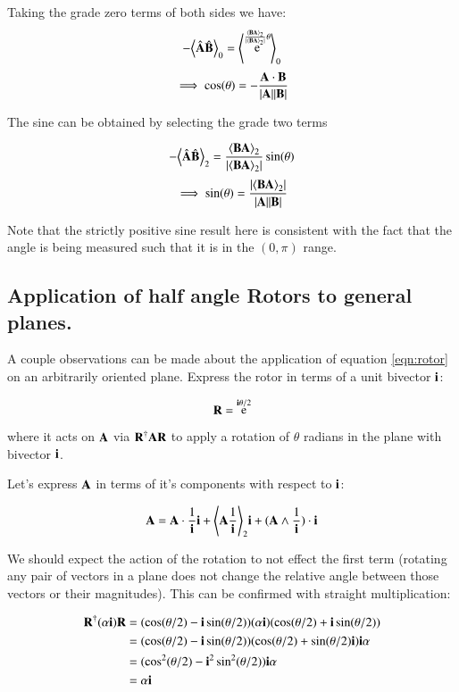\documentclass{article}      %
\DeclareMathOperator{\Exp}{e}
\newcommand{\gpgrade}[2] {{\left\langle{{#1}}\right\rangle}_{#2}}
\newcommand{\gpgradezero}[1] {\gpgrade{#1}{0}}
\newcommand{\gpgradetwo}[1] {\gpgrade{#1}{2}}
\begin{document}
Taking the grade zero terms of both sides we have:
\[
-\gpgradezero{\hat{\BA} \hat{\BB}} = \gpgradezero{ \Exp^{ \frac{\gpgradetwo{\BB \BA}}{\abs{\gpgradetwo{\BB \BA}}} \theta} }
\]
\[
\implies
\cos(\theta) = - \frac{\mathbf{A} \cdot \mathbf{B}}{\lvert{\mathbf{A}}\rvert\lvert{\mathbf{B}}\rvert}
\]


The sine can be obtained by selecting the grade two terms

\[
-\gpgradetwo{\hat{\BA} \hat{\BB}} = \frac{\gpgradetwo{\BB \BA}}{\abs{\gpgradetwo{\BB \BA}}} \sin(\theta)
\]
\[
\implies
\sin(\theta) = \frac{\abs{\gpgradetwo{\BB \BA}}}{ \abs{\BA}\abs{\BB} }
\]

Note that the strictly positive sine result here is consistent with the fact that the angle is being measured such that it is in the
$(0,\pi)$ range.

\subsection{ Application of half angle Rotors to general planes. }

A couple observations can be made about the application of equation \ref{eqn:rotor} on an arbitrarily oriented plane.  Express the rotor
in terms of a unit bivector $\mathbf{i}$:

\[
\BR = \Exp^{\Bi\theta/2}
\]

where it acts on $\mathbf{A}$ via $\mathbf{R}^\dagger \mathbf{A} \mathbf{R}$ to apply a rotation of $\theta$ radians in the plane with bivector $\mathbf{i}$.

Let's express $\mathbf{A}$ in terms of it's components with respect to $\mathbf{i}$:

\begin{equation}\label{eqn:Aicomponents}
\BA = \BA \cdot \inv{\Bi} \Bi + \gpgradetwo{\BA \inv{\Bi}} \Bi + (\BA \wedge \inv{\Bi}) \cdot \Bi
\end{equation}

We should expect the action of the rotation to not effect the first term (rotating any pair of vectors in a plane does not change the
relative angle between those vectors or their magnitudes).  This can be confirmed with straight multiplication:

\begin{align*}
\mathbf{R}^\dagger (\alpha \mathbf{i}) \mathbf{R}
&= (\cos(\theta/2) - \mathbf{i} \sin(\theta/2))(\alpha \mathbf{i}) (\cos(\theta/2) + \mathbf{i} \sin(\theta/2)) \\
&= (\cos(\theta/2) - \mathbf{i} \sin(\theta/2))(\cos(\theta/2) + \sin(\theta/2) \mathbf{i} ) \mathbf{i} \alpha \\
&= (\cos^2(\theta/2) - \mathbf{i}^2 \sin^2(\theta/2)) \mathbf{i} \alpha \\
&= \alpha \mathbf{i} \\
\end{align*}
\end{document}
